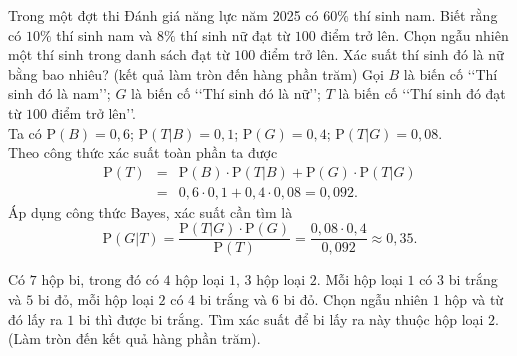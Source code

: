 \begin{bt}%
	Trong một đợt thi Đánh giá năng lực năm 2025 có $60\%$ thí sinh nam. Biết rằng có $10\%$ thí sinh nam và $8\%$ thí sinh nữ đạt từ $100$ điểm trở lên. Chọn ngẫu nhiên một thí sinh trong danh sách đạt từ $100$ điểm trở lên. Xác suất thí sinh đó là nữ bằng bao nhiêu? (kết quả làm tròn đến hàng phần trăm)
	\loigiai
	{
		Gọi $B$ là biến cố \lq\lq Thí sinh đó là nam\rq\rq; $G$ là biến cố \lq\lq Thí sinh đó là nữ\rq\rq; $T$ là biến cố \lq\lq Thí sinh đó đạt từ $100$ điểm trở lên\rq\rq.\\
		Ta có $\mathrm{P}(B)=0{,}6$; $\mathrm{P}(T|B)= 0{,}1$; $\mathrm{P}(G)=0{,}4$; $\mathrm{P}(T|G)=0{,}08$.\\
		Theo công thức xác suất toàn phần ta được
		\begin{eqnarray*}
			\mathrm{P}(T) &=& \mathrm{P}(B) \cdot \mathrm{P}(T|B)+ \mathrm{P}(G)\cdot \mathrm{P}(T|G)\\
			&=& 0{,}6 \cdot 0{,}1 + 0{,}4 \cdot 0{,}08= 0{,}092.
		\end{eqnarray*}
		Áp dụng công thức Bayes, xác suất cần tìm là
				\[
		\mathrm{P}(G|T)= \dfrac{\mathrm{P}(T|G)\cdot \mathrm{P}(G)}{\mathrm{P}(T)}= \dfrac{0{,}08 \cdot 0{,}4}{0{,}092} \approx 0{,}35. 
		\]
	}
\end{bt}

\begin{bt}%
Có $7$ hộp bi, trong đó có $4$ hộp loại $1$, $3$ hộp loại $2$. Mỗi hộp loại $1$ có $3$ bi trắng và $5$ bi đỏ, mỗi hộp loại $2$ có $4$ bi trắng và $6$ bi đỏ. Chọn ngẫu nhiên $1$ hộp và từ đó lấy ra $1$ bi thì được bi trắng. Tìm xác suất để bi lấy ra này thuộc hộp loại $2$.  (Làm tròn đến kết quả hàng phần trăm).
\end{bt}

